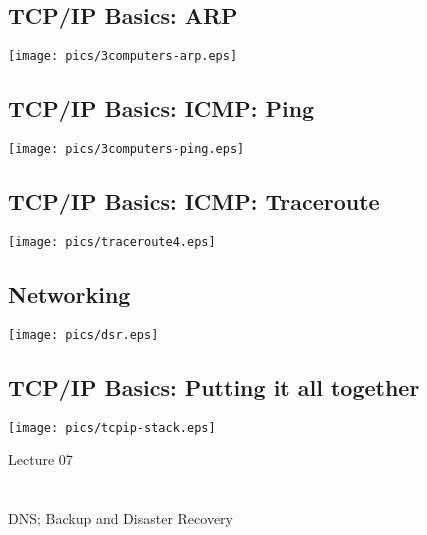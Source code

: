 \documentclass[xga]{xdvislides}
\begin{document}
\subsection{TCP/IP Basics: ARP}
\vspace*{\fill}
\begin{center}
	\texttt{[image: pics/3computers-arp.eps]}
\end{center}
\vspace*{\fill}

\subsection{TCP/IP Basics: ICMP: Ping}
\vspace*{\fill}
\begin{center}
	\texttt{[image: pics/3computers-ping.eps]}
\end{center}
\vspace*{\fill}


\subsection{TCP/IP Basics: ICMP: Traceroute}
\vspace*{\fill}
\begin{center}
	\texttt{[image: pics/traceroute4.eps]}
\end{center}
\vspace*{\fill}

\subsection{Networking}
\vspace*{\fill}
\begin{center}
	\texttt{[image: pics/dsr.eps]} \\
\end{center}
\vspace*{\fill}

\subsection{TCP/IP Basics: Putting it all together}
\vspace*{\fill}
\begin{center}
	\texttt{[image: pics/tcpip-stack.eps]}
\end{center}
\vspace*{\fill}

\newpage
\vspace*{\fill}
\begin{center}
    \Hugesize
        Lecture 07 \\ [1em]
    \hspace*{5mm}
    \blueline\\
    \hspace*{5mm}\\
	DNS; Backup and Disaster Recovery
\end{center}
\vspace*{\fill}
\end{document}
